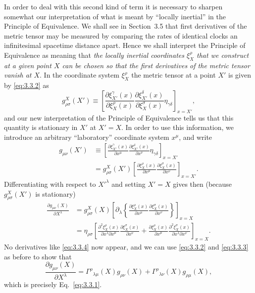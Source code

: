 In order to deal with this second kind of term it is necessary to sharpen
somewhat our interpretation of what is meant by ``locally inertial'' in the
Principle of Equivalence. We shall see in Section~3.5 that first derivatives
of the metric tensor may be measured by comparing the rates of identical
clocks an infinitesimal spacetime distance apart. Hence we shall interpret
the Principle of Equivalence as meaning that \emph{the locally inertial
coordinates $\xi_X^\rho$ that we construct at a given point $X$ can be
chosen so that the first derivatives of the metric tensor vanish at $X$}. In
the coordinate system $\xi_X^\rho$ the metric tensor at a point $X'$ is
given by \eqref{eq:3.3.2} as
\[
  g^X_{\rho\sigma}(X')
  \equiv
  \left[
  \frac{\partial\xi_{X'}^\gamma(x)}
       {\partial\xi_X^\rho(x)}
  \frac{\partial\xi_{X'}^\delta(x)}
       {\partial\xi_X^\sigma(x)}
  \eta_{\gamma\delta}\right]_{x=X'},
\]
and our new interpretation of the Principle of Equivalence tells us that
this quantity is stationary in $X'$ at $X'=X$. In order to use this
information, we introduce an arbitrary ``laboratory'' coordinate system
$x^\mu$, and write
\begin{align*}
  g_{\mu\nu}(X')
  &\equiv
  \left[
  \frac{\partial\xi_{X'}^\gamma(x)}{\partial x^\mu}
  \frac{\partial\xi_{X'}^\delta(x)}{\partial x^\nu}
  \eta_{\gamma\delta}\right]_{x=X'}
  \\
  &=g^X_{\rho\sigma}(X')
  \left[
  \frac{\partial\xi_X^\rho(x)}{\partial x^\mu}
  \frac{\partial\xi_X^\sigma(x)}{\partial x^\nu}
  \right]_{x=X'}.
\end{align*}
Differentiating with respect to $X'^\lambda$ and setting $X'=X$ gives then
(because $g^X_{\rho\sigma}(X')$ is stationary)
\begin{align*}
  \frac{\partial g_{\mu\nu}(X)}{\partial X^\lambda}
  &=
  g^X_{\rho\sigma}(X)
  \left[
  \partial_\lambda\left\{
  \frac{\partial\xi_X^\rho(x)}{\partial x^\mu}
  \frac{\partial\xi_X^\sigma(x)}{\partial x^\nu}
  \right\}\right]_{x=X}
  \\
  &=
  \eta_{\rho\sigma}\left[
  \frac{\partial^2\xi_X^\rho(x)}
  {\partial x^\lambda\partial x^\mu}
  \frac{\partial\xi_X^\sigma(x)}{\partial x^\nu}
  +
  \frac{\partial\xi_X^\rho(x)}{\partial x^\mu}
  \frac{\partial^2\xi_X^\sigma(x)}
  {\partial x^\lambda\partial x^\nu}
  \right]_{x=X}.
\end{align*}
No derivatives like \eqref{eq:3.3.4} now appear, and we can use
\eqref{eq:3.3.2} and \eqref{eq:3.3.3} as before to show that
\[
  \frac{\partial g_{\mu\nu}(X)}{\partial X^\lambda}
  =
  \Gamma^\rho{}_{\lambda\mu}(X)g_{\rho\nu}(X)
  +\Gamma^\rho{}_{\lambda\nu}(X)g_{\rho\mu}(X),
\]
which is precisely Eq.~\eqref{eq:3.3.1}.

